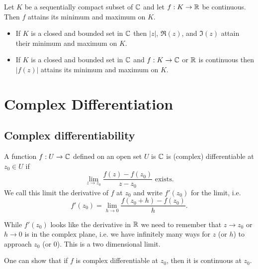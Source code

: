 \documentclass[10pt, a4paper]{article}
\begin{document}
\begin{theorem}
    Let $K$ be a sequentially compact subset of $\mathbb{C}$ and let $f : K \to \mathbb{R}$ be continuous.
    Then $f$ attains its minimum and maximum on $K$.
\end{theorem}

\begin{corollary}
    \begin{itemize}
        \item If $K$ is a closed and bounded set in $\mathbb{C}$ then $|z|$,
        $\Re(z)$,
        and $\Im(z)$ attain their minimum and maximum on $K$.

        \item If $K$ is a closed and bounded set in $\mathbb{C}$ and $f : K \to \mathbb{C}$ or $\mathbb{R}$ is continuous then $|f(z)|$ attains its minimum and maximum on $K$.
    \end{itemize}
\end{corollary}

\newpage

\section{Complex Differentiation}

\subsection{Complex differentiability}

\begin{definition}
    A function $f : U \to \mathbb{C}$ defined on an open set $U$ is $\mathbb{C}$ is
    (complex)
    differentiable at $z_0 \in U$ if
    \[
    \lim_{z \to z_0}\frac{f(z) - f(z_0)}{z - z_0}\text{ exists}.
    \]
    We call this limit the derivative of $f$ at $z_0$ and write $f'(z_0)$ for the limit,
    i.e.
    \[
    f'(z_0) = \lim_{h \to 0}\frac{f(z_0 + h) - f(z_0)}{h}.
    \]
\end{definition}

\begin{remark}
    While $f'(z_0)$ looks like the derivative in $\mathbb{R}$ we need to remember that $z \to z_0$ or $h \to 0$ is in the complex plane,
    i.e. we have infinitely many ways for $z$
    (or $h$)
    to approach $z_0$
    (or $0$).
    This is a two dimensional limit.

    One can show that if $f$ is complex differentiable at $z_0$,
    then it is continuous at $z_0$.
\end{remark}
\end{document}
